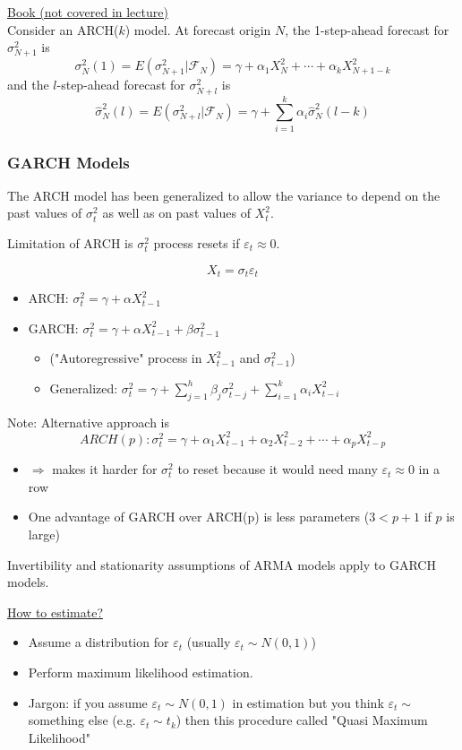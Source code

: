 \noindent
\underline{Book (not covered in lecture)} \\
\noindent
Consider an ARCH($k$) model. At forecast origin $N$, the 1-step-ahead forecast for $\sigma_{N+1}^2$ is \[
\sigma_N^2 (1)=E(\sigma_{N+1}^2| \mathcal{F}_N) = \gamma + \alpha_1 X_N^2 + \cdots + \alpha_k X_{N+1-k}^2
\]
and the $l$-step-ahead forecast for $\sigma_{N+l}^2$ is \[
\hat{\sigma}_N^2(l)= E(\sigma_{N+l}^2| \mathcal{F}_N) = \gamma + \sum_{i=1}^k \alpha_i \hat{\sigma}_N^2 (l-k)
\]

\subsubsection{GARCH Models}
The ARCH model has been generalized to allow the variance to depend on the past values of $\sigma_t^2$ as well as on past values of $X_t^2$.

Limitation of ARCH is $\sigma_t^2$ process resets if $\varepsilon_t \approx0$. 

\[X_t=\sigma_t \varepsilon_t\]
\begin{itemize}
    \item ARCH: $\sigma_t^2=\gamma+\alpha X_{t-1}^2$
    \item GARCH: $\sigma_t^2= \gamma+\alpha X_{t-1}^2 + \beta \sigma_{t-1}^2 $
    \begin{itemize}
        \item[] ("Autoregressive" process in $X_{t-1}^2$ and $\sigma_{t-1}^2$)
        \item Generalized: $\sigma_t^2 =\gamma + \sum_{j=1}^h \beta_j \sigma_{t-j}^2 + \sum_{i=1}^k \alpha_i X_{t-i}^2$
    \end{itemize}
\end{itemize}

Note: Alternative approach is \[ARCH(p): \sigma_t^2 = \gamma +\alpha_1 X_{t-1}^2 + \alpha_2 X_{t-2}^2 + \cdots + \alpha_p X_{t-p}^2\]
\begin{itemize}
    \item[]$\Rightarrow$ makes it harder for $\sigma_t^2$ to reset because it would need many $\varepsilon_t\approx 0$ in a row
    \item One advantage of GARCH over ARCH(p) is less parameters ($3 < p+1$ if $p$ is large)
\end{itemize}

Invertibility and stationarity assumptions of ARMA models apply to GARCH models. 

\noindent
\underline{How to estimate?}
\begin{itemize}
    \item Assume a distribution for $\varepsilon_t$ (usually $\varepsilon_t \sim N(0,1)$)
    \item Perform maximum likelihood estimation.
    \item Jargon: if you assume $\varepsilon_t \sim N(0,1)$ in estimation but you think $\varepsilon_t \sim $ something else (e.g. $\varepsilon_t \sim t_k$) then this procedure called "Quasi Maximum Likelihood"
\end{itemize}

